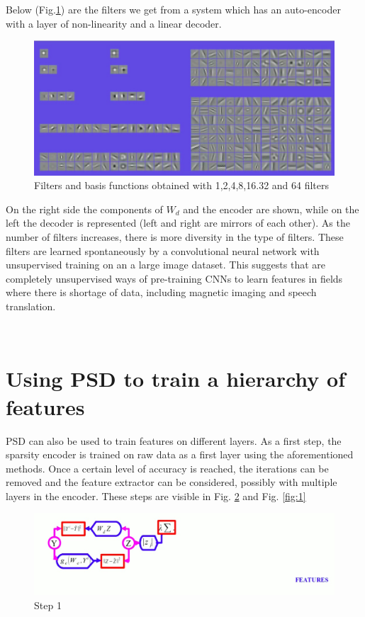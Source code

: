 \documentclass[12pt,letterpaper]{article}
\begin{document}
Below (Fig.\ref{fig:MultipleFilters}) are the filters we get from a system which has an auto-encoder with a layer of non-linearity and a linear decoder. 
\begin{figure}[H]
  \includegraphics[width=\linewidth]{MultipleFilters.jpg}
  \caption{Filters and basis functions obtained with 1,2,4,8,16.32 and 64 filters}
  \label{fig:MultipleFilters}
\end{figure}
On the right side the components of $W_d$ and the encoder are shown, while on the left the decoder is represented (left and right are mirrors of each other). As the number of filters increases, there is more diversity in the type of filters. These filters are learned spontaneously by a convolutional neural network with unsupervised training on an a large image dataset. This suggests that are completely unsupervised ways of pre-training CNNs to learn features in fields where there is shortage of data, including magnetic imaging and speech translation.

\
\section*{Using PSD to train a hierarchy of features}
PSD can also be used to train features on different layers. As a first step, the sparsity encoder is trained on raw data as a first layer using the aforementioned methods. Once a certain level of accuracy is reached, the iterations can be removed and the feature extractor can be considered, possibly with multiple layers in the encoder. These steps are visible in Fig. \ref{fig:0} and Fig. \ref{fig:1} 
\begin{figure}[h!]
  \includegraphics[width=\linewidth]{0.jpg}
  \caption{Step 1}
  \label{fig:0}
\end{figure}
\end{document}

